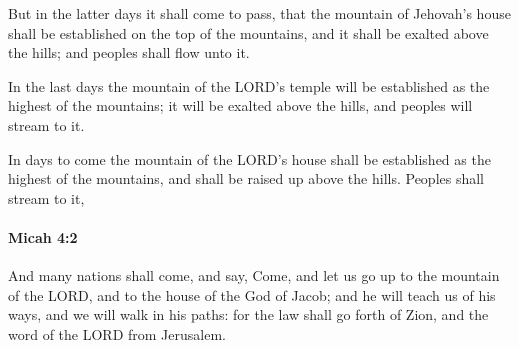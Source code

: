 			\begin{versebox}
					\item[BHS] 
					\item[LXX] 
					\item[ASV] But in the latter days it shall come to pass, that the mountain of Jehovah's house shall be established on the top of the mountains, and it shall be exalted above the hills; and peoples shall flow unto it.
					\item[NIV] In the last days the mountain of the LORD’s temple will be established as the highest of the mountains; it will be exalted above the hills, and peoples will stream to it.
					\item[NRSV] In days to come the mountain of the LORD’s house shall be established as the highest of the mountains, and shall be raised up above the hills. Peoples shall stream to it,
			\end{versebox}

		\paragraph{Micah 4:2} %
			\label{MICAH-4-2}

			And many nations shall come, and say, Come, and let us go up to the mountain of the LORD, and to the house of the God of Jacob; and he will teach us of his ways, and we will walk in his paths: for the law shall go forth of Zion, and the word of the LORD from Jerusalem.

